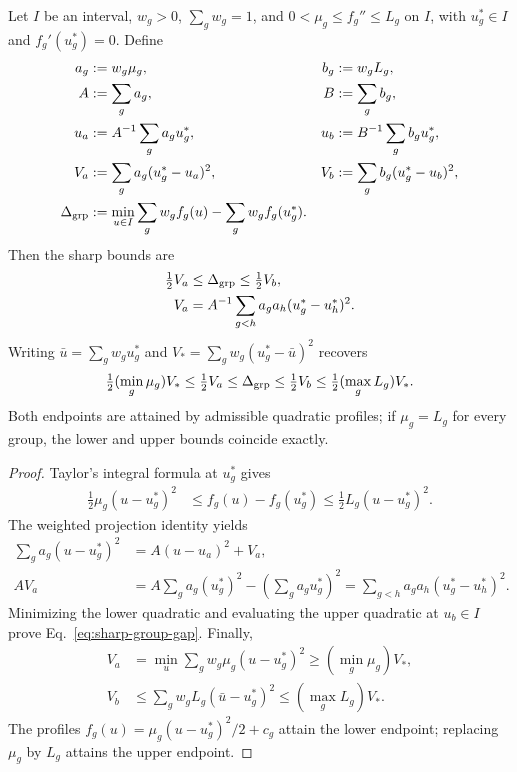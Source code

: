 \begin{proposition}
\label{prop:group-gap}
Let $I$ be an interval, $w_g>0$, $\sum_gw_g=1$, and
$0<\mu_g\le f_g''\le L_g$ on $I$, with $u_g^*\in I$ and $f_g'(u_g^*)=0$.
Define
\begin{align}
 a_g&:=w_g\mu_g,&b_g&:=w_gL_g,\\
 A&:=\sum_ga_g,&B&:=\sum_gb_g,\\
 u_a&:=A^{-1}\sum_ga_gu_g^*,&u_b&:=B^{-1}\sum_gb_gu_g^*,\\
 V_a&:=\sum_ga_g(u_g^*-u_a)^2,&V_b&:=\sum_gb_g(u_g^*-u_b)^2,\\
 \Delta_{\rm grp}&:=\min_{u\in I}\sum_gw_gf_g(u)-\sum_gw_gf_g(u_g^*).
\end{align}
Then the sharp bounds are
\begin{align}\label{eq:sharp-group-gap}
 \tfrac12V_a&\le\Delta_{\rm grp}\le\tfrac12V_b,\\
 V_a&=A^{-1}\sum_{g<h}a_ga_h(u_g^*-u_h^*)^2.
\end{align}
Writing $\bar u=\sum_gw_gu_g^*$ and $V_*=\sum_gw_g(u_g^*-\bar u)^2$ recovers
\begin{align}
 \tfrac12(\min_g\mu_g)V_*\le\tfrac12V_a
 \le\Delta_{\rm grp}\le\tfrac12V_b\le\tfrac12(\max_gL_g)V_*.
\end{align}
Both endpoints are attained by admissible quadratic profiles; if $\mu_g=L_g$ for every group, the lower and upper bounds coincide exactly.
\end{proposition}
\begin{proof}
Taylor's integral formula at $u_g^*$ gives
\begin{align}
 \tfrac12\mu_g(u-u_g^*)^2
 &\le f_g(u)-f_g(u_g^*)\le\tfrac12L_g(u-u_g^*)^2.
\end{align}
The weighted projection identity yields
\begin{align}
 \sum_ga_g(u-u_g^*)^2&=A(u-u_a)^2+V_a,\\
 AV_a&=A\sum_ga_g(u_g^*)^2-\left(\sum_ga_gu_g^*\right)^2
 =\sum_{g<h}a_ga_h(u_g^*-u_h^*)^2.
\end{align}
Minimizing the lower quadratic and evaluating the upper quadratic at $u_b\in I$ prove Eq.~\eqref{eq:sharp-group-gap}. Finally,
\begin{align}
 V_a&=\min_u\sum_gw_g\mu_g(u-u_g^*)^2\ge(\min_g\mu_g)V_*,\\
 V_b&\le\sum_gw_gL_g(\bar u-u_g^*)^2\le(\max_gL_g)V_*.
\end{align}
The profiles $f_g(u)=\mu_g(u-u_g^*)^2/2+c_g$ attain the lower endpoint; replacing $\mu_g$ by $L_g$ attains the upper endpoint.
\end{proof}

